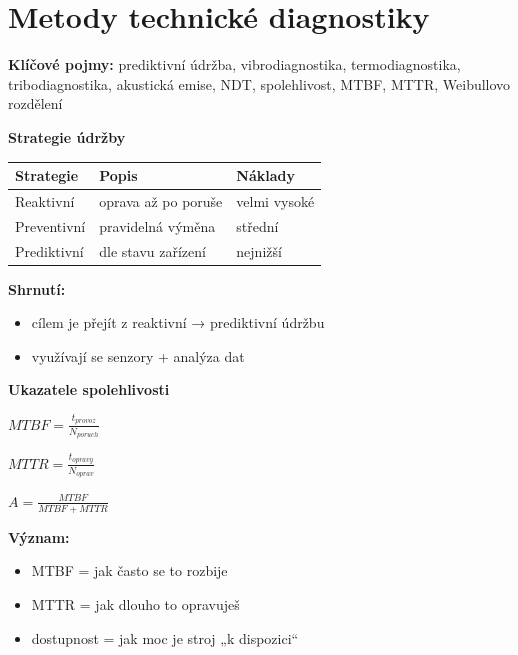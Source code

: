 \documentclass[a4paper,10pt]{article}
\begin{document}
\section{Metody technické diagnostiky}

\begin{pojmybox}
\textbf{Klíčové pojmy:}
prediktivní údržba, vibrodiagnostika, termodiagnostika,
tribodiagnostika, akustická emise, NDT,
spolehlivost, MTBF, MTTR, Weibullovo rozdělení
\end{pojmybox}

\begin{vysvetlenibox}

\textbf{Strategie údržby}

\begin{center}
\begin{tabularx}{0.95\linewidth}{l X X}
Strategie & Popis & Náklady \\
\hline
Reaktivní & oprava až po poruše & velmi vysoké \\
Preventivní & pravidelná výměna & střední \\
Prediktivní & dle stavu zařízení & nejnižší \\
\end{tabularx}
\end{center}

\textbf{Shrnutí:}
\begin{itemize}
\item cílem je přejít z reaktivní → prediktivní údržbu
\item využívají se senzory + analýza dat
\end{itemize}

\textbf{Ukazatele spolehlivosti}

\begin{vzorcebox}
$MTBF = \frac{t_{provoz}}{N_{poruch}}$

$MTTR = \frac{t_{opravy}}{N_{oprav}}$

$A = \frac{MTBF}{MTBF + MTTR}$
\end{vzorcebox}

\textbf{Význam:}
\begin{itemize}
\item MTBF = jak často se to rozbije
\item MTTR = jak dlouho to opravuješ
\item dostupnost = jak moc je stroj „k dispozici“
\end{itemize}


\end{vysvetlenibox}
\end{document}
